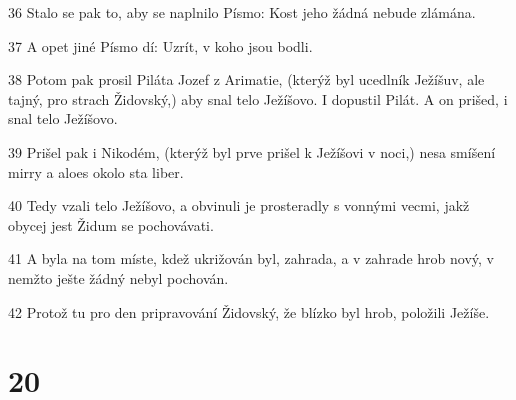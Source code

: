 \par 36 Stalo se pak to, aby se naplnilo Písmo: Kost jeho žádná nebude zlámána.
\par 37 A opet jiné Písmo dí: Uzrít, v koho jsou bodli.
\par 38 Potom pak prosil Piláta Jozef z Arimatie, (kterýž byl ucedlník Ježíšuv, ale tajný, pro strach Židovský,) aby snal telo Ježíšovo. I dopustil Pilát. A on prišed, i snal telo Ježíšovo.
\par 39 Prišel pak i Nikodém, (kterýž byl prve prišel k Ježíšovi v noci,) nesa smíšení mirry a aloes okolo sta liber.
\par 40 Tedy vzali telo Ježíšovo, a obvinuli je prosteradly s vonnými vecmi, jakž obycej jest Židum se pochovávati.
\par 41 A byla na tom míste, kdež ukrižován byl, zahrada, a v zahrade hrob nový, v nemžto ješte žádný nebyl pochován.
\par 42 Protož tu pro den pripravování Židovský, že blízko byl hrob, položili Ježíše.

\chapter{20}

